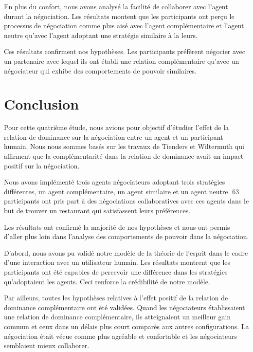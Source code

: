 	En plus du confort, nous avons analysé la facilité de collaborer avec l'agent durant la négociation. Les résultats montent que les participants ont perçu le processus de négociation comme plus aisé avec l'agent complémentaire et l'agent neutre qu'avec l'agent adoptant une stratégie similaire à la leurs. 
	
	Ces résultats confirment nos hypothèses. Les participants préfèrent négocier avec un partenaire avec lequel ils ont établi une relation complémentaire qu'avec un négociateur qui exhibe des comportements de pouvoir similaires. 
	
	
	\section{Conclusion}
		Pour cette quatrième étude, nous avions pour objectif d'étudier l'effet de la relation de dominance sur la négociation entre un agent et un participant humain. Nous nous sommes basés sur les travaux de Tienders et Wiltermuth \cite{wiltermuth2009benefits,tiedens2003power}qui affirment que la complémentarité dans la relation de dominance avait un impact positif sur la négociation. 
		
		Nous avons implémenté trois agents négociateurs adoptant trois stratégies différentes, un agent complémentaire, un agent similaire et un agent neutre. 
		63 participants ont pris part à  des négociations collaboratives avec ces agents dans le but de trouver un restaurant qui satisfassent leurs préférences. 
		
		Les résultats ont confirmé la majorité de nos hypothèses et nous ont permis d'aller plus loin dans l'analyse des comportements de pouvoir dans la négociation. 
		
		D'abord, nous avons pu validé notre modèle de la théorie de l'esprit dans le cadre d'une interaction avec un utilisateur humain. 
		Les résultats montrent que les participants ont été capables de percevoir une différence dans les stratégies qu'adoptaient les agents. Ceci renforce la crédibilité de notre modèle. 
		
		Par ailleurs, toutes les hypothèses relatives à l'effet positif de la relation de dominance complémentaire ont été validées. Quand les négociateurs établissaient une relation de dominance complémentaire, ils atteignaient un meilleur gain commun et ceux dans un délais plus court comparés aux autres configurations. La négociation était vécue comme plus agréable et confortable et les négociateurs semblaient mieux collaborer. 
		
